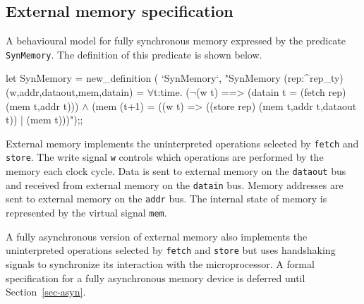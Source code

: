 \subsection{External memory specification}
\label{sec-formmem}

A behavioural model for fully synchronous memory
expressed by the predicate \verb"SynMemory".
The definition of this predicate is shown below.

\begintt
let SynMemory = new_definition (
  `SynMemory`,
  "SynMemory (rep:^rep_ty) (w,addr,dataout,mem,datain) =
    \(\forall\)t:time.
      (\(\neg\)(w t) ==> (datain t = (fetch rep) (mem t,addr t))) \(\wedge\)
      (mem (t+1) =
        ((w t) => ((store rep) (mem t,addr t,dataout t)) | (mem t)))");;
\endtt

External memory implements the
uninterpreted operations selected by \verb"fetch" and \verb"store".
The write signal \verb"w" controls which operations are performed
by the memory each clock cycle.
Data is sent to external memory on the \verb"dataout" bus and received
from external memory on the \verb"datain" bus.
Memory addresses are sent to external memory on the \verb"addr" bus.
The internal state of memory is represented by the virtual signal \verb"mem".

A fully asynchronous version of external memory also implements the
uninterpreted operations selected by \verb"fetch" and \verb"store"
but uses handshaking signals to synchronize its interaction with the
microprocessor.
A formal specification for a fully asynchronous memory device is
deferred until Section~\ref{sec-asyn}.
